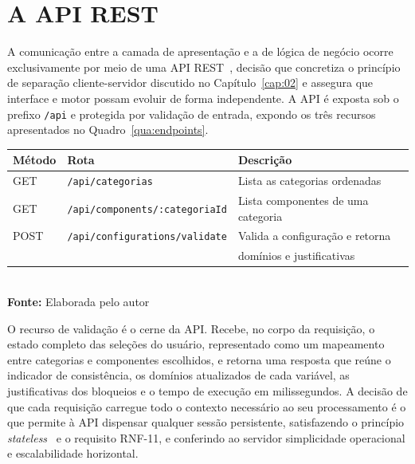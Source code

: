 \section{A API REST}
\label{sec:impl-api}

A comunicação entre a camada de apresentação e a de lógica de negócio ocorre exclusivamente por meio de uma API REST~\cite{Fielding2000}, decisão que concretiza o princípio de separação cliente-servidor discutido no Capítulo~\ref{cap:02} e assegura que interface e motor possam evoluir de forma independente. A API é exposta sob o prefixo \texttt{/api} e protegida por validação de entrada, expondo os três recursos apresentados no Quadro~\ref{qua:endpoints}.

\FloatBarrier
\begin{quadro}[!htbp]
  \centering
  \caption{Recursos expostos pela API REST}
  \begin{tabular}{l l l}
    \hline
    \textbf{Método} & \textbf{Rota}                         & \textbf{Descrição}                 \\ \hline
    GET             & \texttt{/api/categorias}              & Lista as categorias ordenadas      \\ \hline
    GET             & \texttt{/api/components/:categoriaId} & Lista componentes de uma categoria \\ \hline
    POST            & \texttt{/api/configurations/validate} & Valida a configuração e retorna    \\
                    &                                       & domínios e justificativas          \\ \hline
  \end{tabular}
  \\ \vspace{0.2cm}
  \textbf{Fonte:} Elaborada pelo autor
  \label{qua:endpoints}
\end{quadro}
\FloatBarrier

O recurso de validação é o cerne da API. Recebe, no corpo da requisição, o estado completo das seleções do usuário, representado como um mapeamento entre categorias e componentes escolhidos, e retorna uma resposta que reúne o indicador de consistência, os domínios atualizados de cada variável, as justificativas dos bloqueios e o tempo de execução em milissegundos. A decisão de que cada requisição carregue todo o contexto necessário ao seu processamento é o que permite à API dispensar qualquer sessão persistente, satisfazendo o princípio \textit{stateless}~\cite{Fielding2000} e o requisito RNF-11, e conferindo ao servidor simplicidade operacional e escalabilidade horizontal.

